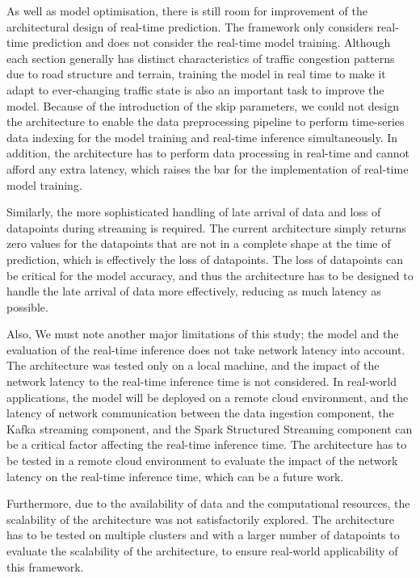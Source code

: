 \documentclass[11pt]{uonthesis}
\begin{document}
As well as model optimisation, there is still room for improvement of the architectural design of real-time prediction. The framework only considers real-time prediction and does not consider the real-time model training. Although each section generally has distinct characteristics of traffic congestion patterns due to road structure and terrain, training the model in real time to make it adapt to ever-changing traffic state is also an important task to improve the model. Because of the introduction of the skip parameters, we could not design the architecture to enable the data preprocessing pipeline to perform time-series data indexing for the model training and real-time inference simultaneously. In addition, the architecture has to perform data processing in real-time and cannot afford any extra latency, which raises the bar for the implementation of real-time model training.

Similarly, the more sophisticated handling of late arrival of data and loss of datapoints during streaming is required. The current architecture simply returns zero values for the datapoints that are not in a complete shape at the time of prediction, which is effectively the loss of datapoints. The loss of datapoints can be critical for the model accuracy, and thus the architecture has to be designed to handle the late arrival of data more effectively, reducing as much latency as possible.

Also, We must note another major limitations of this study; the model and the evaluation of the real-time inference does not take network latency into account. The architecture was tested only on a local machine, and the impact of the network latency to the real-time inference time is not considered. In real-world applications, the model will be deployed on a remote cloud environment, and the latency of network communication between the data ingestion component, the Kafka streaming component, and the Spark Structured Streaming component can be a critical factor affecting the real-time inference time. The architecture has to be tested in a remote cloud environment to evaluate the impact of the network latency on the real-time inference time, which can be a future work.

Furthermore, due to the availability of data and the computational resources, the scalability of the architecture was not satisfactorily explored. The architecture has to be tested on multiple clusters and with a larger number of datapoints to evaluate the scalability of the architecture, to ensure real-world applicability of this framework.
\end{document}

